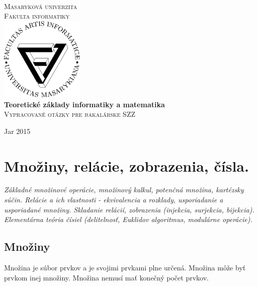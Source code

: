 \documentclass[a4paper,10pt]{article}
\begin{document}
\begin{titlepage}
\begin{center}
\textsc{ }\\[2cm]
\textsc{\LARGE Masaryková univerzita}\\[0.2cm]
\textsc{\LARGE Fakulta informatiky}\\[0.5cm]
\includegraphics[width=0.3\textwidth]{./filogo}~\\[3cm]


{ \huge \bfseries Teoretické základy informatiky a matematika \\[0.4cm] }
\textsc{\Large Vypracované otázky pre bakalárske SZZ}\\[0.5cm]

\vspace*{\fill}



{\large Jar 2015}

\end{center}
\end{titlepage}

\tableofcontents
\pagebreak

\section{Množiny, relácie, zobrazenia, čísla.} 
\textit{Základné množinové operácie, množinový kalkul, potenčná množina, kartézsky súčin. Relácie a ich vlastnosti - ekvivalencia a rozklady, usporiadanie a usporiadané množiny. Skladanie relácií, zobrazenia (injekcia, surjekcia, bijekcia). Elementárna teória čísiel (delitelnosť, Euklidov algoritmus, modulárne operácie).}
	\subsection{Množiny}
	Množina je súbor prvkov a je svojimi prvkami plne určená. Množina môže byť prvkom inej množiny. Množina nemusí mať konečný počet prvkov.
	
\end{document}
